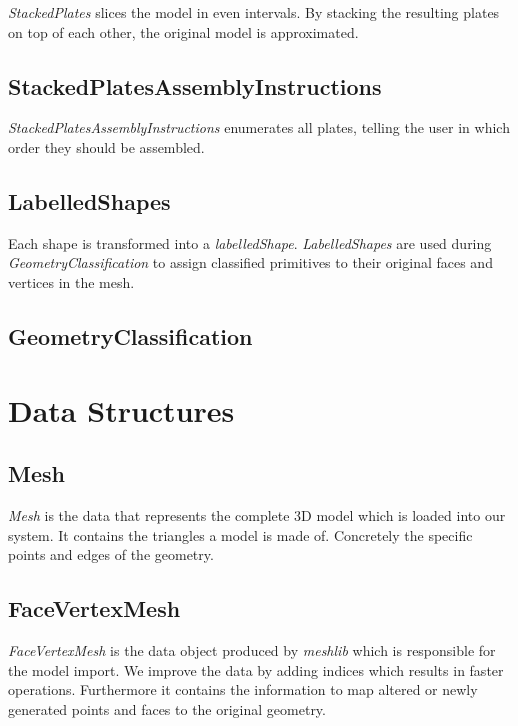 \documentclass[../ClassicThesis.tex]{subfiles}
\begin{document}
\emph{StackedPlates} slices the model in even intervals. By stacking the resulting plates on top of each other, the original model is approximated.


\subsection*{StackedPlatesAssemblyInstructions}

\emph{StackedPlatesAssemblyInstructions} enumerates all plates, telling the user in which order they should be assembled.


\subsection*{LabelledShapes}

Each shape is transformed into a \emph{labelledShape}. \emph{LabelledShapes} are used during \emph{GeometryClassification} to assign classified primitives to their original faces and vertices in the mesh.


\subsection*{GeometryClassification}




\section{Data Structures}

\subsection*{Mesh}

\emph{Mesh} is the data that represents the complete 3D model which is loaded into our system. It contains the triangles a model is made of. Concretely the specific points and edges of the geometry.

\subsection*{FaceVertexMesh}

\emph{FaceVertexMesh} is the data object produced by \emph{meshlib} which is responsible for the model import. We improve the data by adding indices which results in faster operations. Furthermore it contains the information to map altered or newly generated points and faces to the original geometry.
\end{document}
